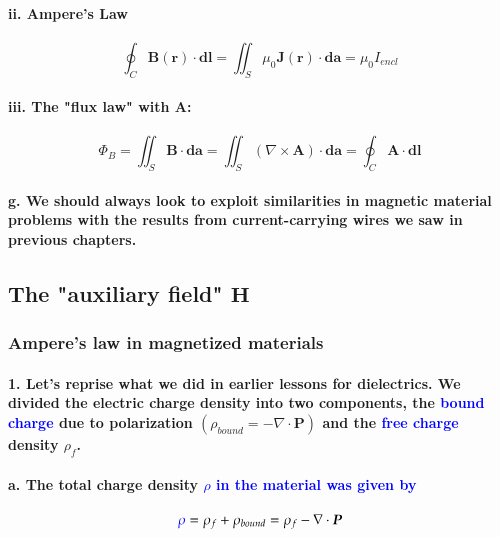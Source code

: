 \documentclass{article}
\begin{document}
\paragraph{\indent\indent ii. Ampere's Law}
\begin{equation*}
    \oint_C \boldsymbol{B}(\boldsymbol{r})\cdot\boldsymbol{dl}=\iint_S \mu_0\boldsymbol{J}(\boldsymbol{r})\cdot\boldsymbol{da}=\mu_0 I_{encl}
\end{equation*}
\paragraph{\indent\indent iii. The "flux law" with $\boldsymbol{A}$:}
\begin{equation*}
    \Phi_B=\iint_S \boldsymbol{B}\cdot\boldsymbol{da}=\iint_S(\nabla\times\boldsymbol{A})\cdot\boldsymbol{da}=\oint_C\boldsymbol{A}\cdot\boldsymbol{dl}
\end{equation*}
\paragraph{\indent g. We should always look to exploit similarities in magnetic material problems with the results from current-carrying wires we saw in previous chapters.}
\subsection{The "auxiliary field" $\boldsymbol{H}$}
\subsubsection{Ampere's law in magnetized materials}
\paragraph{1. Let's reprise what we did in earlier lessons for dielectrics. We divided the electric charge density into two components, the \textcolor{blue}{bound charge} due to polarization $(\rho_{bound}=-\nabla\cdot\boldsymbol{P})$ and the \textcolor{blue}{free charge} density $\rho_f$.}
\paragraph{\indent a. The total charge density \textcolor{blue}{$\rho$ in the material was given by}}
\begin{equation*}
    \textcolor{blue}{\rho}=\rho_f+\rho_{bound}=\rho_f-\nabla\cdot \boldsymbol{P}
\end{equation*}
\end{document}
